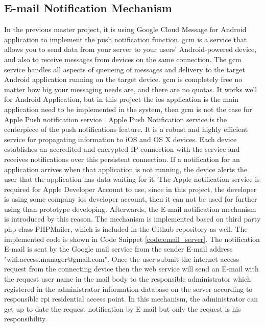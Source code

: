 \subsection{E-mail Notification Mechanism}
\par In the previous master project, it is using Google Cloud Message\cite{gcm} for Android application to implement the push notification function. \gls{gcm} is a service that allows you to send data from your server to your users' Android-powered device, and also to receive messages from devices on the same connection. The \gls{gcm} service handles all aspects of queueing of messages and delivery to the target Android application running on the target device. \gls{gcm} is completely free no matter how big your messaging needs are, and there are no quotas. It works well for Android Application, but in this project the \gls{ios} application is the main application need to be implemented in the system, then \gls{gcm} is not the case for Apple Push notification service \cite{apns}. Apple Push Notification service is the centerpiece of the push notifications feature. It is a robust and highly efficient service for propagating information to iOS and OS X devices. Each device establishes an accredited and encrypted IP connection with the service and receives notifications over this persistent connection. If a notification for an application arrives when that application is not running, the device alerts the user that the application has data waiting for it. The Apple notification service is required for Apple Developer Account to use, since in this project, the developer is using some company \gls{ios} developer account, then it can not be used for further using than prototype developing. Afterwards, the E-mail notification mechanism is introduced by this reason. The mechanism is implemented based on third party \gls{php} class PHPMailer, which is included in the Github repository as well. The implemented code is shown in Code Snippet \ref{code:email_server}. The notification E-mail is sent by the Google mail service from the sender E-mail address "wifi.access.manager@gmail.com". Once the user submit the internet access request from the connecting device then the web service will send an E-mail with the request user name in the mail body to the responsible administrator which registered in the administrator information database on the server according to responsible \gls{rpi} residential access point. In this mechanism, the administrator can get up to date the request notification by E-mail but only the request is his responsibility.

